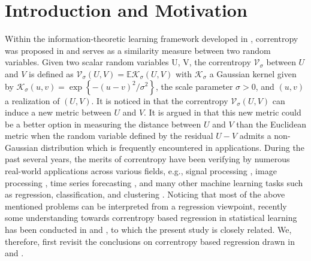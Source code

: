\documentclass[11pt]{article}
\begin{document}
\section{Introduction and Motivation}\label{sec:intro}
Within the information-theoretic learning framework developed in \cite{principe2010information}, correntropy was proposed in \cite{santamaria2006generalized,liu2007correntropy} and serves as a similarity measure between two random variables. Given two scalar random variables U, V, the correntropy $\mathcal{V}_\sigma$ between $U$ and $V$ is defined as $\mathcal {V}_\sigma(U,V)=\mathbb{E} \mathcal{K}_\sigma(U,V)$ with $\mathcal{K}_\sigma$ a Gaussian kernel given by $\mathcal{K}_\sigma(u,v)=\exp\left\{-(u-v)^2/\sigma^2\right\}$, the scale parameter $\sigma>0$, and $(u,v)$ a realization of $(U,V)$. It is noticed in \cite{liu2007correntropy} that the correntropy $\mathcal {V}_\sigma(U,V)$ can induce a new metric between $U$ and $V$. It is argued in \cite{liu2007correntropy,principe2010information} that this new metric could be a better option in measuring the distance between $U$ and $V$ than the Euclidean metric when the random variable defined by the residual $U-V$ admits a non-Gaussian distribution which is frequently encountered in applications. During the past several years, the merits of correntropy have been verifying by numerous real-world applications across various fields, e.g., signal processing \cite{liu2007correntropy,chen2012maximum,chen2016generalized,chen2017maximum,zou2018robust}, image processing \cite{he2011robust,he2011maximum,he20122,hasanbelliu2014information,wang2014robust,wang2015robust,zhu2017correntropy,wang2017correntropy}, time series forecasting \cite{bessa2009entropy,bessa2010information,mendes2011development}, and many other machine learning tasks such as regression, classification, and clustering \cite{wang2013non,singh2014c,xu2016robust}. Noticing that most of the above mentioned problems can be interpreted from a regression viewpoint, recently some understanding towards correntropy based regression in statistical learning has been conducted in \cite{fenglearning} and \cite{feng2017statistical}, to which the present study is closely related. We, therefore, first revisit the conclusions on correntropy based regression drawn in \cite{fenglearning} and \cite{feng2017statistical}. 
\end{document}
